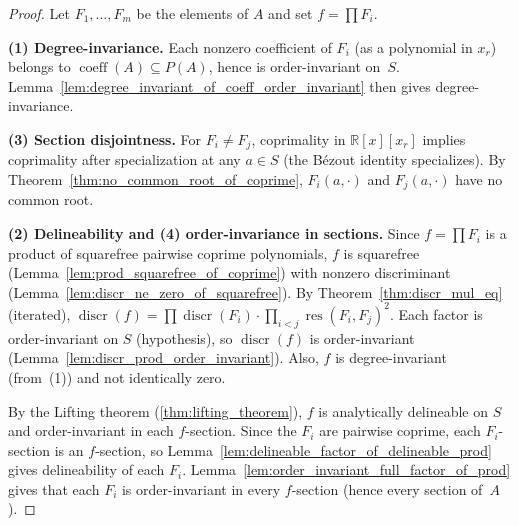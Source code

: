 \begin{proof}
  Let $F_1, \ldots, F_m$ be the elements of $A$ and set $f = \prod F_i$.

  \textbf{(1) Degree-invariance.}
  Each nonzero coefficient of $F_i$ (as a polynomial in $x_r$) belongs to
  $\operatorname{coeff}(A) \subseteq P(A)$, hence is order-invariant on~$S$.
  Lemma~\ref{lem:degree_invariant_of_coeff_order_invariant} then gives
  degree-invariance.

  \textbf{(3) Section disjointness.}
  For $F_i \ne F_j$, coprimality in $\mathbb{R}[x][x_r]$ implies coprimality
  after specialization at any $a \in S$ (the B\'ezout identity specializes).
  By Theorem~\ref{thm:no_common_root_of_coprime}, $F_i(a, \cdot)$ and $F_j(a, \cdot)$
  have no common root.

  \textbf{(2) Delineability and (4) order-invariance in sections.}
  Since $f = \prod F_i$ is a product of squarefree pairwise coprime polynomials,
  $f$ is squarefree (Lemma~\ref{lem:prod_squarefree_of_coprime}) with nonzero discriminant
  (Lemma~\ref{lem:discr_ne_zero_of_squarefree}).
  By Theorem~\ref{thm:discr_mul_eq} (iterated),
  $\operatorname{discr}(f) = \prod \operatorname{discr}(F_i) \cdot
  \prod_{i<j} \operatorname{res}(F_i, F_j)^2$.  Each factor is order-invariant
  on $S$ (hypothesis), so $\operatorname{discr}(f)$ is order-invariant
  (Lemma~\ref{lem:discr_prod_order_invariant}).  Also, $f$ is degree-invariant (from~(1))
  and not identically zero.

  By the Lifting theorem (\ref{thm:lifting_theorem}), $f$ is analytically delineable on $S$
  and order-invariant in each $f$-section.  Since the $F_i$ are pairwise coprime,
  each $F_i$-section is an $f$-section, so Lemma~\ref{lem:delineable_factor_of_delineable_prod} gives
  delineability of each $F_i$.  Lemma~\ref{lem:order_invariant_full_factor_of_prod} gives that each $F_i$
  is order-invariant in every $f$-section (hence every section of~$A$).
\end{proof}
